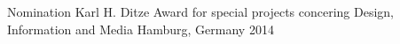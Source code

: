 
\begin{cvhonors}

\cvhonor
  {Nomination}
  {Karl H. Ditze Award for special projects concering Design, Information and Media}
  {Hamburg, Germany}
  {2014}

\end{cvhonors}
